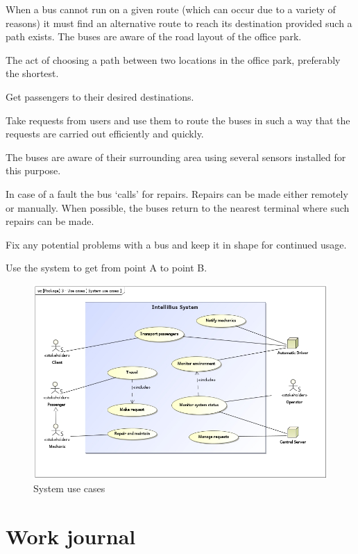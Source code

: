 \documentclass[a4paper]{article}
\begin{document}
\begin{description}[style=nextline]
	\item[Find alternative \gls{route}]
		When a bus cannot run on a given \gls{route} (which can occur
		due to a variety of reasons) it must find an alternative
		\gls{route} to reach its destination provided such a path
		exists. The buses are aware of the road layout of the office
		park.

	\item[Select \gls{route}]
		The act of choosing a path between two locations in the office
		park, preferably the shortest.

	\item[Transport passengers]
		Get passengers to their desired destinations.

	\item[Manage \gls{request}s]
		Take \gls{request}s from users and use them to \gls{route} the
		buses in such a way that the \gls{request}s are carried out
		efficiently and quickly.

	\item[Monitor environment]
		The buses are aware of their surrounding area using several
		\gls{sensor}s installed for this purpose.

	\item[Notify mechanics]
		In case of a fault the bus ‘calls’ for repairs. Repairs can be
		made either remotely or manually. When possible, the buses
		return to the nearest \gls{terminal} where such repairs can be
		made.

	\item[Repair and maintain]
		Fix any potential problems with a bus and keep it in shape for
		continued usage.

	\item[Travel]
		Use the system to get from point A to point B.
\end{description}

\begin{figure}
	\centering
	\includegraphics[width=\textwidth]{uc-system}
	\caption{System use cases}
\end{figure}


\section{Work journal}


\clearpage
\printglossaries
\end{document}
